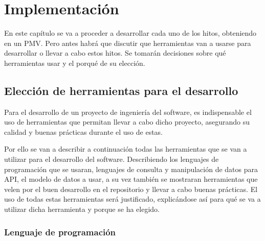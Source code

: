 \chapter{Implementación}

En este capítulo se va a proceder a desarrollar cada uno de los hitos, obteniendo en un PMV. Pero antes habrá que discutir que herramientas van a usarse para desarrollar o llevar a cabo estos hitos. Se tomarán decisiones sobre qué herramientas usar y el porqué de su elección.

\section{Elección de herramientas para el desarrollo}

Para el desarrollo de un proyecto de ingeniería del software, es indispensable el uso de herramientas que permitan llevar a cabo dicho proyecto, asegurando su calidad y buenas prácticas durante el uso de estas.

Por ello se van a describir a continuación todas las herramientas que se van a utilizar para el desarrollo del software. Describiendo los lenguajes de programación que se usaran, lenguajes de consulta y manipulación de datos para API, el modelo de datos a usar, a su vez también se mostraran herramientas que velen por el buen desarrollo en el repositorio y llevar a cabo buenas prácticas. El uso de todas estas herramientas será justificado, explicándose así para qué se va a utilizar dicha herramienta y porque se ha elegido.

\subsection{Lenguaje de programación}

